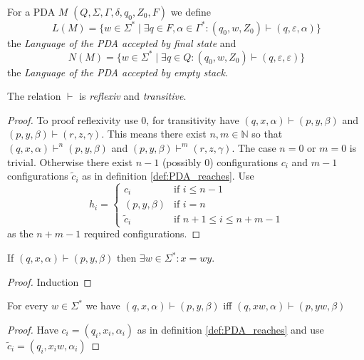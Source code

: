 \begin{definition}
  \label{def:PDA_language}
  For a PDA $M$ $(Q,\Sigma,\Gamma,\delta,q_0,Z_0,F)$ we define $$L(M)=\{w\in\Sigma^*\mid
  \exists q\in F,\alpha\in\Gamma^*: (q_0,w,Z_0)\vdash(q,\varepsilon,\alpha)\}$$ the
  \emph {Language of the PDA accepted by final state} and $$N(M)=\{w\in\Sigma^*\mid
  \exists q\in Q: (q_0,w,Z_0)\vdash(q,\varepsilon,\varepsilon)\}$$ the
  \emph {Language of the PDA accepted by empty stack}.

\end{definition}
\begin{theorem}\label{thm:PDA_reaches}
  The relation $\vdash$ is \emph{reflexiv} and \emph{transitive}.
\end{theorem}
\begin{proof}
  To proof reflexivity use $0$,
  for transitivity have  $(q,x,\alpha)\vdash(p,y,\beta)$ and
  $(p,y,\beta)\vdash(r,z,\gamma)$. This means there exist $n,m\in\mathbb{N}$ so that
  $(q,x,\alpha)\vdash^n(p,y,\beta)$ and $(p,y,\beta)\vdash^m(r,z,\gamma)$.
  The case $n=0$ or $m=0$ is trivial. Otherwise there exist $n-1$ (possibly $0$) configurations
  $c_i$ and $m-1$ configurations $\tilde{c}_i$ as in definition \ref{def:PDA_reaches}.
  Use
  $$
  h_i =
  \begin{cases}
    c_i          & \text{if } i\le n-1 \\
    (p,y,\beta) & \text{if } i = n \\
    \tilde{c}_i  & \text{if } n+1\le i \le n+m-1
  \end{cases}
  $$
  as the $n+m-1$ required configurations.
\end{proof}
\begin{theorem}\label{thm:PDA_reaches_input_decreasing}
  If $(q,x,\alpha)\vdash(p,y,\beta)$ then $\exists w\in\Sigma^*: x=wy$.
\end{theorem}
\begin{proof}
  Induction
\end{proof}
\begin{theorem}\label{thm:PDA_reaches_unconsumed_input}
  For every $w\in\Sigma^*$ we have $(q,x,\alpha)\vdash(p,y,\beta)$ iff $(q,xw,\alpha)\vdash(p,yw,\beta)$
\end{theorem}
\begin{proof}
  Have $c_i = (q_i,x_i,\alpha_i)$ as in definition \ref{def:PDA_reaches} and use
  $\tilde{c}_i = (q_i,x_iw,\alpha_i)$
\end{proof}
